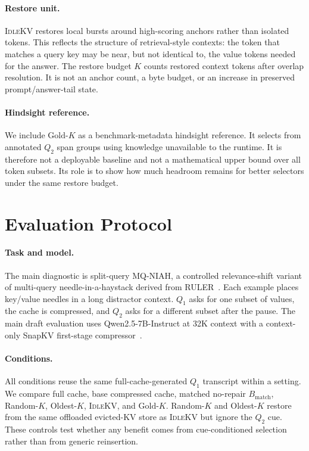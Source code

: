 \documentclass{article}
\newcommand{\idlekv}{\textsc{IdleKV}}
\newcommand{\bmatch}{\ensuremath{B_{\mathrm{match}}}}
\newcommand{\goldk}{\ensuremath{\mathrm{Gold}\mbox{-}K}}
\begin{document}
\paragraph{Restore unit.}
\idlekv{} restores local bursts around high-scoring anchors rather than
isolated tokens.
This reflects the structure of retrieval-style contexts: the token that
matches a query key may be near, but not identical to, the value tokens
needed for the answer.
The restore budget $K$ counts restored context tokens after overlap
resolution.
It is not an anchor count, a byte budget, or an increase in preserved
prompt/answer-tail state.

\paragraph{Hindsight reference.}
We include $\goldk{}$ as a benchmark-metadata hindsight reference.
It selects from annotated $Q_2$ span groups using knowledge unavailable
to the runtime.
It is therefore not a deployable baseline and not a mathematical upper
bound over all token subsets.
Its role is to show how much headroom remains for better selectors under
the same restore budget.

\section{Evaluation Protocol}
\label{sec:protocol}

\paragraph{Task and model.}
The main diagnostic is split-query MQ-NIAH, a controlled relevance-shift
variant of multi-query needle-in-a-haystack derived from
RULER~\citep{ruler}.
Each example places key/value needles in a long distractor context.
$Q_1$ asks for one subset of values, the cache is compressed, and $Q_2$
asks for a different subset after the pause.
The main draft evaluation uses Qwen2.5-7B-Instruct at 32K context with a
context-only SnapKV first-stage compressor~\citep{qwen,snapkv}.

\paragraph{Conditions.}
All conditions reuse the same full-cache-generated $Q_1$ transcript
within a setting.
We compare full cache, base compressed cache, matched no-repair
$\bmatch$, Random-$K$, Oldest-$K$, \idlekv{}, and $\goldk{}$.
Random-$K$ and Oldest-$K$ restore from the same offloaded evicted-KV
store as \idlekv{} but ignore the $Q_2$ cue.
These controls test whether any benefit comes from cue-conditioned
selection rather than from generic reinsertion.
\end{document}
